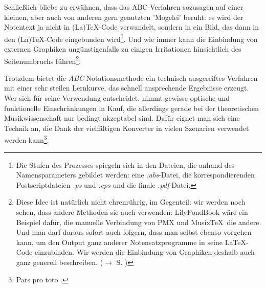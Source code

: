 Schließlich bliebe zu erwähnen, dass das ABC-Verfahren sozusagen auf einer
kleinen, aber auch von anderen gern genutzten 'Mogelei' beruht: es wird der
Notentext ja nicht in (La)\TeX-Code verwandelt, sondern in ein Bild, das dann in
den (La)\TeX-Code eingebunden wird\footnote{Die Stufen des Prozesses spiegeln
sich in den Dateien, die anhand des Namensparameters gebildet werden: eine
\textit{.abs}-Datei, die korrespondierenden Postscriptdateien \textit{.ps} und
\textit{.eps} und die finale \textit{.pdf}-Datei.}. Und wie immer kann die
Einbindung von externen Graphiken ungünstigenfalls zu einigen Irritationen
hinsichtlich des Seitenumbruchs führen\footnote{Diese Idee ist natürlich nicht
ehrenrührig, im Gegenteil: wir werden noch sehen, dass andere Methoden sie auch
verwenden: LilyPondBook wäre ein Beispiel dafür, die manuelle Verbindung von PMX
und Musix\TeX\ die andere. Und man darf daraus sofort auch folgern, dass man
selbst ebenso vorgehen kann, um den Output ganz anderer Notensatzprogramme in
seine \LaTeX-Code einzubinden. Wir werden die Einbindung von Graphiken deshalb
auch ganz generell beschreiben.
($\rightarrow$ S. \pageref{IncludeGraphics})}.\label{AbcGraphics}

Trotzdem bietet die \textit{ABC}-Notationsmethode ein technisch ausgereiftes
Verfahren mit einer sehr steilen Lernkurve, das schnell ansprechende Ergebnisse
erzeugt. Wer sich für seine Verwendung entscheidet, nimmt gewisse optische und
funktionelle Einschränkungen in Kauf, die allerdings gerade bei der
theoretischen Musikwissenschaft nur bedingt akzeptabel sind.
Dafür eignet man sich eine Technik an, die Dank der vielfältigen Konverter in
vielen Szenarien verwendet werden kann\footnote{Pars pro toto
\cite[vgl.][\nopage wp]{Rosen2018a}.}.
% 
